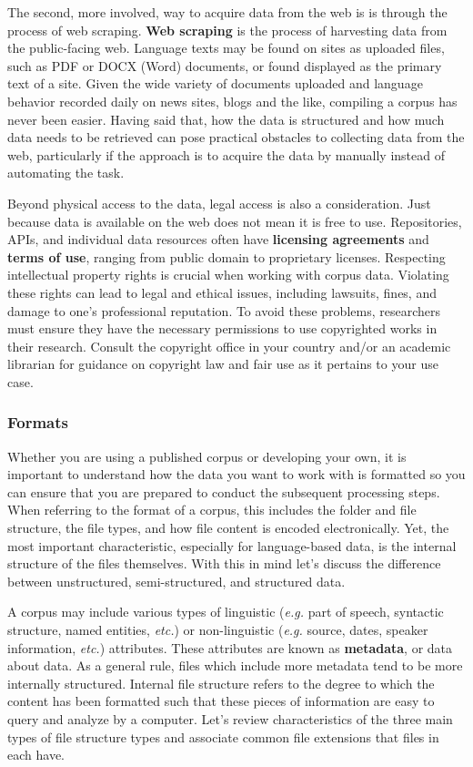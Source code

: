 \documentclass[
  letterpaper,
  krantz1]{latex/krantz-mod}
\theoremstyle{definition}
\theoremstyle{definition}
\theoremstyle{remark}
\begin{document}
The second, more involved, way to acquire data from the web is is
through the process of web scraping. \textbf{Web
scraping} is the process of harvesting data from the
public-facing web. Language texts may be found on sites as uploaded
files, such as PDF or DOCX (Word) documents, or found displayed as the
primary text of a site. Given the wide variety of documents uploaded and
language behavior recorded daily on news sites, blogs and the like,
compiling a corpus has never been easier. Having said that, how the data
is structured and how much data needs to be retrieved can pose practical
obstacles to collecting data from the web, particularly if the approach
is to acquire the data by manually instead of automating the task.

Beyond physical access to the data, legal access is also a
consideration. Just because data is available on the web does not mean
it is free to use. Repositories, APIs, and individual data resources
often have \textbf{licensing agreements} and \textbf{terms of use},
ranging from public domain to proprietary licenses.
Respecting intellectual property rights is crucial when working with
corpus data. Violating these rights can lead to legal and ethical
issues, including lawsuits, fines, and damage to one's professional
reputation. To avoid these problems, researchers must ensure they have
the necessary permissions to use copyrighted works in their research.
Consult the copyright office in your country and/or an academic
librarian for guidance on copyright law and fair use as it pertains to
your use case.

\subsubsection{Formats}\label{formats}

Whether you are using a published corpus or developing your own, it is
important to understand how the data you want to work with is formatted
so you can ensure that you are prepared to conduct the subsequent
processing steps. When referring to the format of a
corpus, this includes the folder and file
structure, the file types, and how file content is encoded
electronically. Yet, the most important characteristic, especially for
language-based data, is the internal structure of the files themselves.
With this in mind let's discuss the difference between unstructured,
semi-structured, and structured data.

A corpus may include various types of linguistic (\emph{e.g.} part of
speech, syntactic structure, named entities, \emph{etc.}) or
non-linguistic (\emph{e.g.} source, dates, speaker information,
\emph{etc.}) attributes. These attributes are known as
\textbf{metadata}, or data about data. As a general
rule, files which include more metadata tend to be more internally
structured. Internal file structure refers to the degree to which the
content has been formatted such that these pieces of information are
easy to query and analyze by a computer. Let's review characteristics of
the three main types of file structure types and associate common file
extensions that files in each have.
\end{document}
